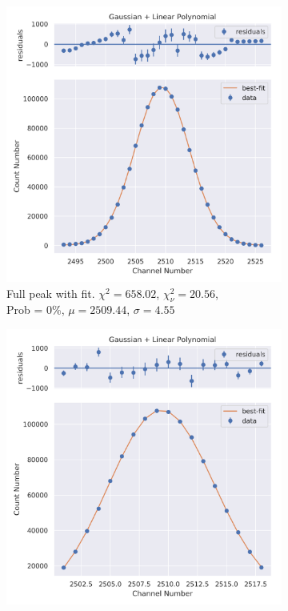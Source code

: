 \documentclass[11pt,a4paper]{article}
\begin{document}
\begin{figure}[H]
  \centering
  \begin{subfigure}{.5\linewidth}
    \centering
    \includegraphics[width=\linewidth]{./Images/Barium133/Linear/Linear_6_Full.png}
    \caption{Full peak with fit. $\chi^2 = 658.02$, $\chi^2_\nu = 20.56$, \\ Prob = 0\%, $\mu = 2509.44$, $\sigma = 4.55$}
  \end{subfigure}%
  \begin{subfigure}{.5\linewidth}
    \centering
    \includegraphics[width=\linewidth]{./Images/Barium133/Linear/Linear_6_Zoom.png}

\end{subfigure}
\end{figure}
\end{document}
